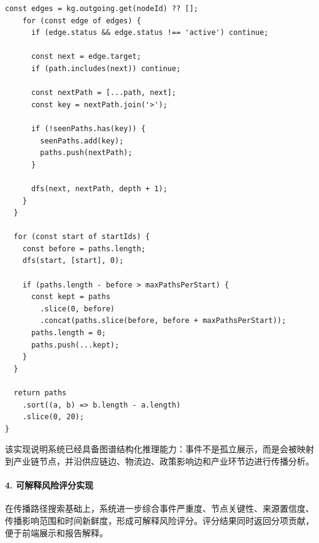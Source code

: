 ﻿\documentclass[12pt,a4paper]{article}
\begin{document}
\begin{lstlisting}[style=projectcode,caption={事件到产业链图谱的匹配与传播路径搜索}]
    const edges = kg.outgoing.get(nodeId) ?? [];
    for (const edge of edges) {
      if (edge.status && edge.status !== 'active') continue;

      const next = edge.target;
      if (path.includes(next)) continue;

      const nextPath = [...path, next];
      const key = nextPath.join('>');

      if (!seenPaths.has(key)) {
        seenPaths.add(key);
        paths.push(nextPath);
      }

      dfs(next, nextPath, depth + 1);
    }
  }

  for (const start of startIds) {
    const before = paths.length;
    dfs(start, [start], 0);

    if (paths.length - before > maxPathsPerStart) {
      const kept = paths
        .slice(0, before)
        .concat(paths.slice(before, before + maxPathsPerStart));
      paths.length = 0;
      paths.push(...kept);
    }
  }

  return paths
    .sort((a, b) => b.length - a.length)
    .slice(0, 20);
}
\end{lstlisting}

该实现说明系统已经具备图谱结构化推理能力：事件不是孤立展示，而是会被映射到产业链节点，并沿供应链边、物流边、政策影响边和产业环节边进行传播分析。

\paragraph{4. 可解释风险评分实现}

在传播路径搜索基础上，系统进一步综合事件严重度、节点关键性、来源置信度、传播影响范围和时间新鲜度，形成可解释风险评分。评分结果同时返回分项贡献，便于前端展示和报告解释。
\end{document}
